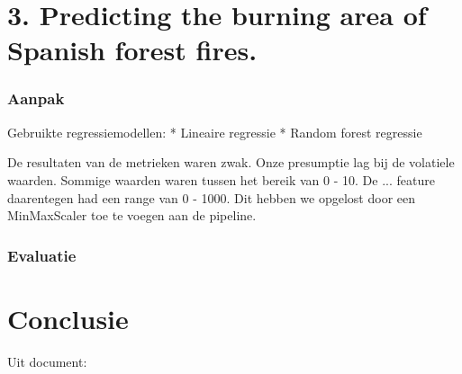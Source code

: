 \documentclass[a4paper,12pt,twoside]{report}
\begin{document}
\chapter*{3. Predicting the burning area of Spanish forest fires.}

\subsection*{Aanpak}

Gebruikte regressiemodellen:
* Lineaire regressie
* Random forest regressie

De resultaten van de metrieken waren zwak. Onze presumptie lag bij de volatiele waarden. Sommige waarden waren tussen het bereik van 0 - 10. De ... feature daarentegen had een range van 0 - 1000. Dit hebben we opgelost door een MinMaxScaler toe te voegen aan de pipeline.

\subsection*{Evaluatie}

\chapter*{Conclusie}

Uit document:



\appendix
\end{document}
